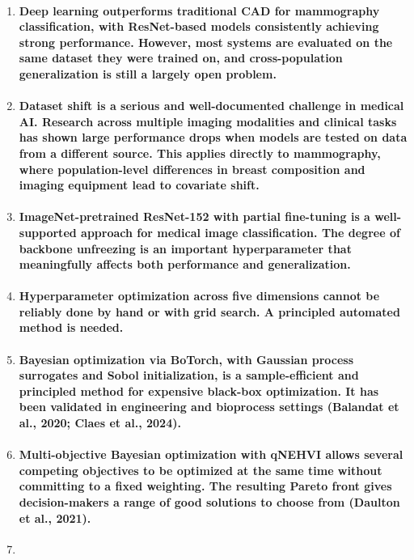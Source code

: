 \begin{enumerate}
\def\labelenumi{\arabic{enumi}.}
\item
  \paragraph{Deep learning outperforms traditional CAD for mammography classification, with ResNet-based models consistently achieving strong performance. However, most systems are evaluated on the same dataset they were trained on, and cross-population generalization is still a largely open problem.}
\item
  \paragraph{Dataset shift is a serious and well-documented challenge in medical AI. Research across multiple imaging modalities and clinical tasks has shown large performance drops when models are tested on data from a different source. This applies directly to mammography, where population-level differences in breast composition and imaging equipment lead to covariate shift.}
\item
  \paragraph{ImageNet-pretrained ResNet-152 with partial fine-tuning is a well-supported approach for medical image classification. The degree of backbone unfreezing is an important hyperparameter that meaningfully affects both performance and generalization.}
\item
  \paragraph{Hyperparameter optimization across five dimensions cannot be reliably done by hand or with grid search. A principled automated method is needed.}
\item
  \paragraph{Bayesian optimization via BoTorch, with Gaussian process surrogates and Sobol initialization, is a sample-efficient and principled method for expensive black-box optimization. It has been validated in engineering and bioprocess settings (Balandat et al., 2020; Claes et al., 2024).}
\item
  \paragraph{Multi-objective Bayesian optimization with qNEHVI allows several competing objectives to be optimized at the same time without committing to a fixed weighting. The resulting Pareto front gives decision-makers a range of good solutions to choose from (Daulton et al., 2021).}
\item

\end{enumerate}
